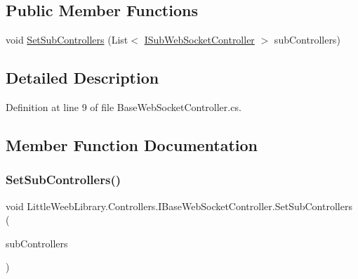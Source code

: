 \subsection*{Public Member Functions}
\begin{DoxyCompactItemize}
\item 
void \mbox{\hyperlink{interface_little_weeb_library_1_1_controllers_1_1_i_base_web_socket_controller_a80d53e08202c06f729b0aa90d36c152f}{Set\+Sub\+Controllers}} (List$<$ \mbox{\hyperlink{interface_little_weeb_library_1_1_controllers_1_1_i_sub_web_socket_controller}{I\+Sub\+Web\+Socket\+Controller}} $>$ sub\+Controllers)
\end{DoxyCompactItemize}


\subsection{Detailed Description}


Definition at line 9 of file Base\+Web\+Socket\+Controller.\+cs.



\subsection{Member Function Documentation}
\mbox{\label{interface_little_weeb_library_1_1_controllers_1_1_i_base_web_socket_controller_a80d53e08202c06f729b0aa90d36c152f}} 
\subsubsection{\texorpdfstring{Set\+Sub\+Controllers()}{SetSubControllers()}}
{\footnotesize\ttfamily void Little\+Weeb\+Library.\+Controllers.\+I\+Base\+Web\+Socket\+Controller.\+Set\+Sub\+Controllers (\begin{DoxyParamCaption}\item[{List$<$ \mbox{\hyperlink{interface_little_weeb_library_1_1_controllers_1_1_i_sub_web_socket_controller}{I\+Sub\+Web\+Socket\+Controller}} $>$}]{sub\+Controllers }\end{DoxyParamCaption})}



